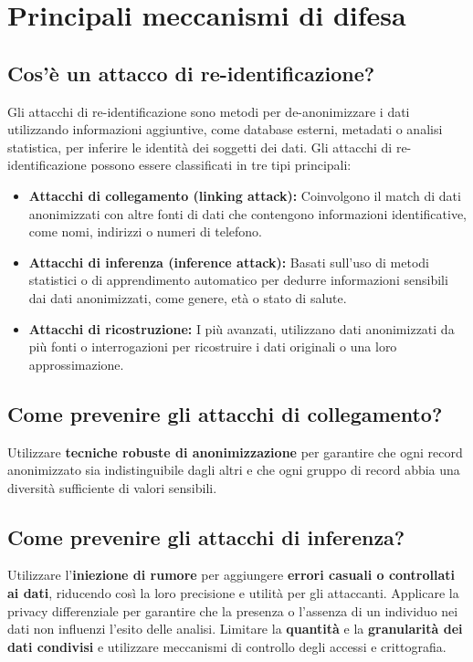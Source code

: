 \chapter{Principali meccanismi di difesa}

\section{Cos'è un attacco di re-identificazione?}

Gli attacchi di re-identificazione sono metodi per de-anonimizzare i dati utilizzando informazioni aggiuntive, come database esterni, metadati o analisi statistica, per inferire le identità dei soggetti dei dati. Gli attacchi di re-identificazione possono essere classificati in tre tipi principali:

\begin{itemize}
    \item \textbf{Attacchi di collegamento (linking attack):} Coinvolgono il match di dati anonimizzati con altre fonti di dati che contengono informazioni identificative, come nomi, indirizzi o numeri di telefono.
    \item \textbf{Attacchi di inferenza (inference attack):} Basati sull'uso di metodi statistici o di apprendimento automatico per dedurre informazioni sensibili dai dati anonimizzati, come genere, età o stato di salute.
    \item \textbf{Attacchi di ricostruzione:} I più avanzati, utilizzano dati anonimizzati da più fonti o interrogazioni per ricostruire i dati originali o una loro approssimazione.
\end{itemize}

\section{Come prevenire gli attacchi di collegamento?}

Utilizzare \textbf{tecniche robuste di anonimizzazione} per garantire che ogni record anonimizzato sia indistinguibile dagli altri e che ogni gruppo di record abbia una diversità sufficiente di valori sensibili.

\section{Come prevenire gli attacchi di inferenza?}

Utilizzare l'\textbf{iniezione di rumore} per aggiungere\textbf{ errori casuali o controllati ai dati}, riducendo così la loro precisione e utilità per gli attaccanti. Applicare la privacy differenziale per garantire che la presenza o l'assenza di un individuo nei dati non influenzi l'esito delle analisi. Limitare la \textbf{quantità} e la\textbf{ granularità dei dati condivisi} e utilizzare meccanismi di controllo degli accessi e crittografia.

